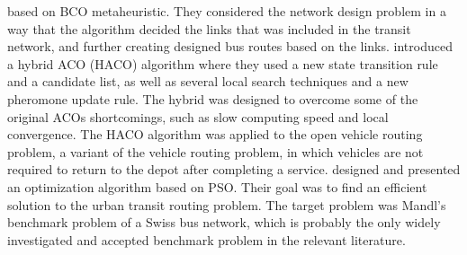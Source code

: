 based on BCO metaheuristic. They considered the network design problem in a way that the algorithm decided the links that was included in the transit network, and further creating designed bus routes based on the links. \citet{sedighpour14} introduced a hybrid ACO (HACO) algorithm where they used a new state transition rule and a candidate list, as well as several local search techniques and a new pheromone update rule. The hybrid was designed to overcome some of the original ACOs shortcomings, such as slow computing speed and local convergence. The HACO algorithm was applied to the open vehicle routing problem, a variant of the vehicle routing problem, in which vehicles are not required to return to the depot after completing a service. \citet{kechagiopoulos14} designed and presented an optimization algorithm based on PSO. Their goal was to find an efficient solution to the urban transit routing problem. The target problem was Mandl's benchmark problem of a Swiss bus network, which is probably the only widely investigated and accepted benchmark problem in the relevant literature. 


